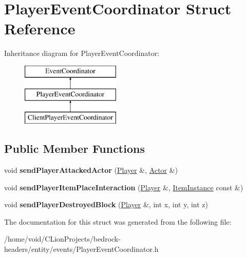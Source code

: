 \hypertarget{struct_player_event_coordinator}{}\section{Player\+Event\+Coordinator Struct Reference}
\label{struct_player_event_coordinator}
Inheritance diagram for Player\+Event\+Coordinator\+:\begin{figure}[H]
\begin{center}
\leavevmode
\includegraphics[height=3.000000cm]{struct_player_event_coordinator}
\end{center}
\end{figure}
\subsection*{Public Member Functions}
\begin{DoxyCompactItemize}
\item 
\mbox{\label{struct_player_event_coordinator_a42767f58953e30b75ff253b4b4d785e7}} 
void {\bfseries send\+Player\+Attacked\+Actor} (\mbox{\hyperlink{struct_player}{Player}} \&, \mbox{\hyperlink{struct_actor}{Actor}} \&)
\item 
\mbox{\label{struct_player_event_coordinator_ad77d92e554a02085b8f656420841f33d}} 
void {\bfseries send\+Player\+Item\+Place\+Interaction} (\mbox{\hyperlink{struct_player}{Player}} \&, \mbox{\hyperlink{struct_item_instance}{Item\+Instance}} const \&)
\item 
\mbox{\label{struct_player_event_coordinator_a39d0adcbd382ea4debb7d102365e006e}} 
void {\bfseries send\+Player\+Destroyed\+Block} (\mbox{\hyperlink{struct_player}{Player}} \&, int x, int y, int z)
\end{DoxyCompactItemize}


The documentation for this struct was generated from the following file\+:\begin{DoxyCompactItemize}
\item 
/home/void/\+C\+Lion\+Projects/bedrock-\/headers/entity/events/Player\+Event\+Coordinator.\+h\end{DoxyCompactItemize}
